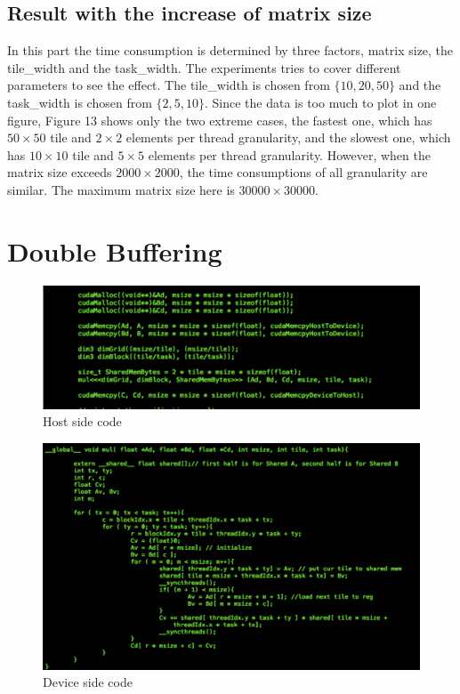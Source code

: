 \documentclass {article}
\begin{document}
\subsection{Result with the increase of matrix size}
In this part the time consumption is determined by three factors, matrix size, the tile\_width and the task\_width. The experiments tries to cover different parameters to see the effect. The tile\_width is chosen from $\{10, 20, 50\}$ and the task\_width is chosen from $\{2, 5, 10\}$. Since the data is too much to plot in one figure, Figure 13 shows only the two extreme cases, the fastest one, which has $50 \times 50$ tile and $2 \times 2$ elements per thread granularity, and the slowest one, which has $10 \times 10$ tile and $5 \times 5$ elements per thread granularity. However, when the matrix size exceeds $2000 \times 2000$, the time consumptions of all granularity are similar. The maximum matrix size here is $30000 \times 30000$.
\section{Double Buffering}

\begin{figure}[htp!]
\centering
\includegraphics[width = \linewidth]{gpu41.pdf}
\caption{Host side code}
\label{fig:gpu41}
\end{figure}

\begin{figure}[htp!]
\centering
\includegraphics[width = \linewidth]{gpu42.pdf}
\caption{Device side code}
\label{fig:gpu42}
\end{figure}
\end{document}
